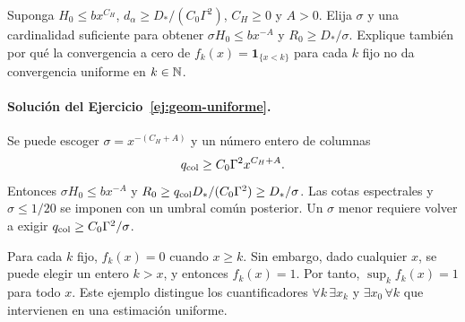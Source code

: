 \begin{ejercicio}\label{ej:geom-uniforme}
Suponga $H_0\le bx^{C_H}$,
$d_\alpha\ge D_*/(C_0\Gamma^2)$,
$C_H\ge0$ y $A>0$.
Elija $\sigma$ y una cardinalidad suficiente para obtener
$\sigma H_0\le bx^{-A}$ y $R_0\ge D_*/\sigma$.
Explique también por qué la convergencia a cero de
$f_k(x)=\mathbf1_{\{x<k\}}$ para cada $k$ fijo no da
convergencia uniforme en $k\in\mathbb{N}$.
\end{ejercicio}

\paragraph{Solución del Ejercicio~\ref{ej:geom-uniforme}.}
Se puede escoger
$\sigma=x^{-(C_H+A)}$ y un número entero de columnas
\[
 q_{\rm col}\ge C_0\Gamma^2x^{C_H+A}.
\]
Entonces $\sigma H_0\le bx^{-A}$ y
$R_0\ge q_{\rm col}D_*/(C_0\Gamma^2)\ge D_*/\sigma$.
Las cotas espectrales y $\sigma\le1/20$ se imponen con
un umbral común posterior.
Un $\sigma$ menor requiere volver a exigir
$q_{\rm col}\ge C_0\Gamma^2/\sigma$.

Para cada $k$ fijo, $f_k(x)=0$ cuando $x\ge k$.
Sin embargo, dado cualquier $x$, se puede elegir un entero
$k>x$, y entonces $f_k(x)=1$.
Por tanto, $\sup_k f_k(x)=1$ para todo $x$.
Este ejemplo distingue los cuantificadores
$\forall k\,\exists x_k$ y $\exists x_0\,\forall k$ que
intervienen en una estimación uniforme.




